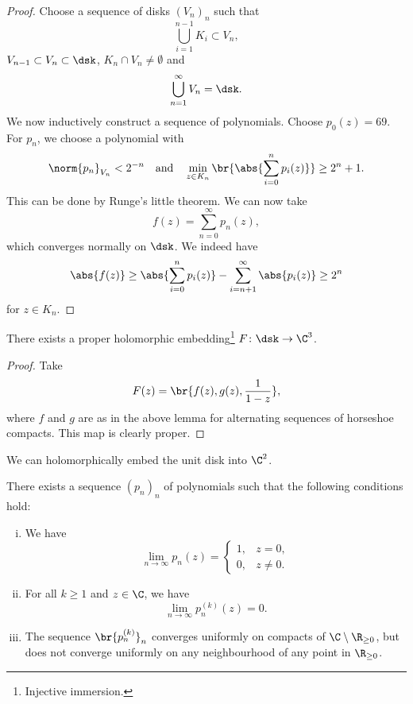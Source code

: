 \begin{proof}
Choose a sequence of disks $(V_n)_n$ such that
\[
\bigcup_{i=1}^{n-1} K_i \subset V_n,
\]
$V_{n-1} \subset V_n \subset \dsk$, $K_n \cap V_n \ne \emptyset$
and
\[
\bigcup_{n=1}^\infty V_n = \dsk.
\]
We now inductively construct a sequence of polynomials. Choose
$p_0(z) = 69$. For $p_n$, we choose a polynomial with
\[
\norm{p_n}_{V_n} < 2^{-n}
\quad \text{and} \quad
\min_{z \in K_n} \br{\abs{\sum_{i=0}^n p_i(z)}} \geq 2^n + 1.
\]
This can be done by Runge's little theorem. We can now take
\[
f(z) = \sum_{n=0}^\infty p_n(z),
\]
which converges normally on $\dsk$. We indeed have
\[
\abs{f(z)} \geq
\abs{\sum_{i=0}^n p_i(z)} - \sum_{i=n+1}^\infty \abs{p_i(z)} \geq
2^n
\]
for $z \in K_n$.
\end{proof}

\begin{izrek}
There exists a proper holomorphic embedding\footnote{Injective
immersion.} $F \colon \dsk \to \C^3$.
\end{izrek}

\begin{proof}
Take
\[
F(z) = \br{f(z), g(z), \frac{1}{1-z}},
\]
where $f$ and $g$ are as in the above lemma for alternating
sequences of horseshoe compacts. This map is clearly proper.
\end{proof}

\begin{opomba}
We can holomorphically embed the unit disk into $\C^2$.
\end{opomba}

\begin{izrek}
There exists a sequence $(p_n)_n$ of polynomials such that the
following conditions hold:

\begin{enumerate}[i)]
\item We have
\[
\lim_{n \to \infty} p_n(z) =
\begin{cases}
1, & z  =  0, \\
0, & z \ne 0.
\end{cases}
\]
\item For all $k \geq 1$ and $z \in \C$, we have
\[
\lim_{n \to \infty} p_n^{(k)}(z) = 0.
\]
\item The sequence $\br{p_n^{(k)}}_n$ converges uniformly on
compacts of $\C \setminus \R_{\geq 0}$, but does not converge
uniformly on any neighbourhood of any point in $\R_{\geq 0}$.
\end{enumerate}
\end{izrek}

